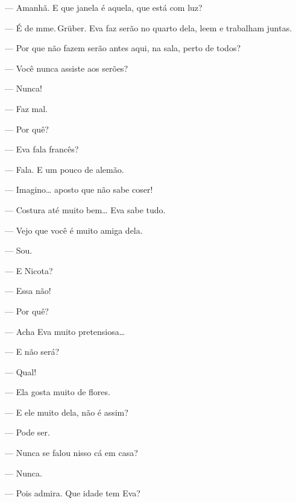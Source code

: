 {

--- Amanhã. E que janela é aquela, que está com luz?

--- É de mme.\,Grüber. Eva faz serão no quarto dela, leem e trabalham juntas.

--- Por que não fazem serão antes aqui, na sala, perto de todos?


--- Você nunca assiste aos serões?

--- Nunca!

--- Faz mal.

--- Por quê?



--- Eva fala francês?

--- Fala. E um pouco de alemão.

--- Imagino\ldots{} aposto que não sabe coser!

--- Costura até muito bem\ldots{} Eva sabe tudo.

--- Vejo que você é muito amiga dela.

--- Sou.

--- E Nicota?

--- Essa não!

--- Por quê?

--- Acha Eva muito pretensiosa\ldots{}

--- E não será?

--- Qual!


--- Ela gosta muito de flores.

--- E ele muito dela, não é assim?

--- Pode ser.

--- Nunca se falou nisso cá em casa?

--- Nunca.

--- Pois admira. Que idade tem Eva?

}
